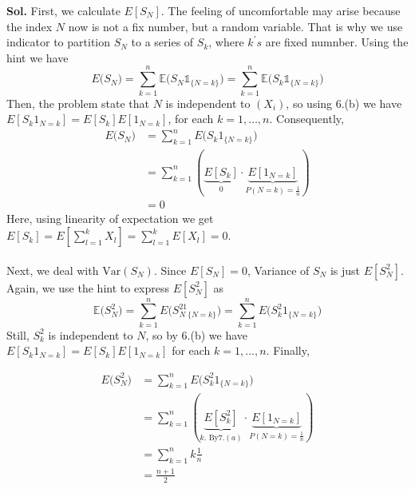 \begin{enumerate}
\textbf{Sol.} First, we calculate \(E[S_N]\). 
The feeling of uncomfortable may arise because the index \(N\) now is not a fix number, but a random variable. That is why we use indicator to partition \(S_N\) to a series of \(S_k\), where \(k^\prime s\) are fixed numnber.     
Using the hint we have
\[
E\big(S_N\big) = \sum_{k=1}^n\mathbb{E}\big(S_N\mathds{1}_{\{N=k\}}\big)=\sum_{k=1}^n\mathbb{E}\big(S_k\mathds{1}_{\{N=k\}}\big)
\]   
Then, the problem state that \(N\) is independent to \((X_i)\), so using 6.(b) we have \(E[S_k 1_{N=k}] = E[S_k]E[1_{N = k} ] \), for each \(k = 1,\dots, n\). 
Consequently, 
\begin{equation*}
    \begin{aligned}
E\big(S_N\big) &=\sum_{k=1}^n E \big(S_k 1_{\{N=k\}}\big)
        \\ &= \sum_{k=1}^{n}(\underbrace{E[S_k]}_{0}\cdot \underbrace{E[1_{N= k} ]}_{P(N=k) = \frac{1}{n}} )
        \\ &= 0
    \end{aligned}
\end{equation*}
Here, using linearity of expectation we get \(E[S_k] =  E[\sum_{l=1}^{k} X_l ]  = \sum_{l=1}^{k} E[X_l] = 0\). 
\\ 
\\
Next, we deal with \(\text{Var}(S_N) \). Since \(E[S_N] =0\), Variance of \(S_N\) is just \(E[S_N^2]\). Again, we use the hint to express \(E[S_N^2]\) as 
\[
\mathbb{E}\big(S_N^2\big) = \sum_{k=1}^n E\big(S_N^21_{\{N=k\}}\big)=\sum_{k=1}^n E\big(S_k^2 1_{\{N=k\}}\big)
\]
Still, \(S_k^2\) is independent to \(N\), so by 6.(b) we have \(E[S_k 1_{N=k} ] = E[S_k]E[1_{N= k} ]\) for each \(k = 1, ... , n\). Finally, 
  
\begin{equation*}
    \begin{aligned}
E\big(S_N^2\big) &=\sum_{k=1}^n E\big(S_k^2 1_{\{N=k\}}\big)
        \\ &= \sum_{k=1}^{n}(\underbrace{E[S_k^2]}_{k. \text{ By} 7.(a)}\cdot \underbrace{E[1_{N= k} ]}_{P(N=k) = \frac{1}{n}} )
        \\ &= \sum_{k=1}^{n} k \frac{1}{n}
        \\ &= \frac{n+1}{2} 
    \end{aligned}
\end{equation*}  
\end{enumerate}


